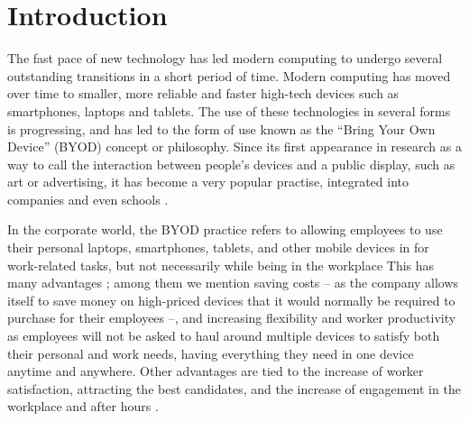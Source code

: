 \documentclass[a4paper,10pt,twocolumn,preprint,3p]{elsarticle}
\begin{document}
\section{Introduction}
\label{sec:intro}

The fast pace of new technology has led modern computing to undergo
several outstanding transitions in a short period of time. Modern
computing has moved over time to smaller, more reliable and faster
high-tech devices such as smartphones, laptops and tablets. The use of
these technologies in several forms is progressing, and has led to the
form of use known as the ``Bring Your Own Device'' (BYOD) concept or
philosophy. Since its first appearance in research
\cite{ballagas2004byod} as a way to call the interaction between
people's devices and a public display, such as art or advertising, it
has become a very popular practise, integrated into companies
\cite{thomson2012byod} and even schools \cite{song2014bring}.  

In the corporate world, the BYOD
practice refers to allowing employees to use their
personal laptops, smartphones, tablets, and other mobile devices in
for work-related tasks, but not necessarily while being in the workplace This has many
advantages \cite{singh2012byod}; among them we mention saving costs --
as the company allows itself to save money on high-priced devices that
it would normally be required to purchase for their employees --, and
increasing flexibility and worker productivity as employees will not
be asked to haul around multiple devices to satisfy both their personal and
work needs, having everything they need in one device anytime and
anywhere. 
Other advantages are tied to the increase of worker satisfaction, attracting the best candidates, and the increase of engagement in the workplace and after hours \cite{singh2012byod}. %
\end{document}
